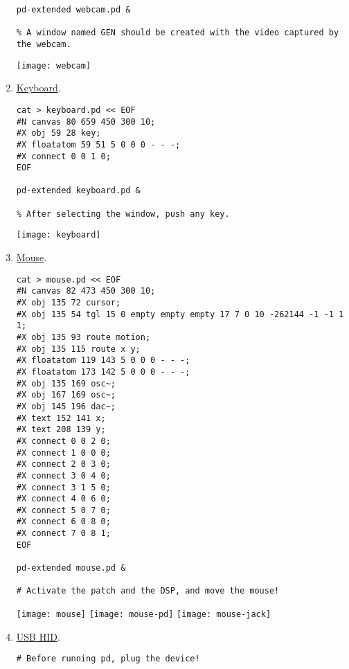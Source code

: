 \begin{enumerate}
\begin{verbatim}
pd-extended webcam.pd &

% A window named GEN should be created with the video captured by the webcam.
\end{verbatim}

\begin{center}
  \texttt{[image: webcam]}
\end{center}

\item \href{http://en.flossmanuals.net/pure-data/ch056_game-controllers/}{Keyboard}.
\begin{verbatim}
cat > keyboard.pd << EOF
#N canvas 80 659 450 300 10;
#X obj 59 28 key;
#X floatatom 59 51 5 0 0 0 - - -;
#X connect 0 0 1 0;
EOF

pd-extended keyboard.pd &

% After selecting the window, push any key.
\end{verbatim}

\begin{center}
  \texttt{[image: keyboard]}
\end{center}

\item \href{http://en.flossmanuals.net/pure-data/ch056_game-controllers/}{Mouse}.
\begin{verbatim}
cat > mouse.pd << EOF
#N canvas 82 473 450 300 10;
#X obj 135 72 cursor;
#X obj 135 54 tgl 15 0 empty empty empty 17 7 0 10 -262144 -1 -1 1
1;
#X obj 135 93 route motion;
#X obj 135 115 route x y;
#X floatatom 119 143 5 0 0 0 - - -;
#X floatatom 173 142 5 0 0 0 - - -;
#X obj 135 169 osc~;
#X obj 167 169 osc~;
#X obj 145 196 dac~;
#X text 152 141 x;
#X text 208 139 y;
#X connect 0 0 2 0;
#X connect 1 0 0 0;
#X connect 2 0 3 0;
#X connect 3 0 4 0;
#X connect 3 1 5 0;
#X connect 4 0 6 0;
#X connect 5 0 7 0;
#X connect 6 0 8 0;
#X connect 7 0 8 1;
EOF

pd-extended mouse.pd &

# Activate the patch and the DSP, and move the mouse!
\end{verbatim}

\begin{center}
  \texttt{[image: mouse]}
  \texttt{[image: mouse-pd]}
  \texttt{[image: mouse-jack]}
\end{center}

\item \href{http://en.flossmanuals.net/pure-data/ch056_game-controllers/}{USB HID}.

\begin{verbatim}
# Before running pd, plug the device!


\end{verbatim}
\end{enumerate}
